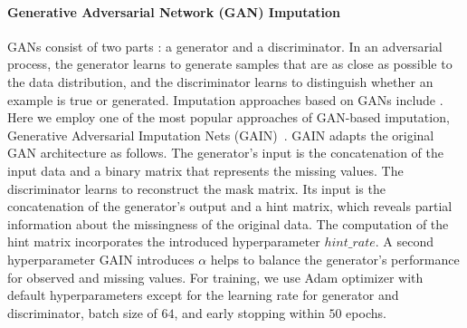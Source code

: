 \paragraph{Generative Adversarial Network (GAN) Imputation}
%
GANs consist of two parts \citep{GAN}: a generator and a discriminator. In an adversarial process, the generator learns to generate samples that are as close as possible to the data distribution, and the discriminator learns to distinguish whether an example is true or generated. Imputation approaches based on GANs include \cite{GAIN, VIGAN, MisGAN}.
Here we employ one of the most popular approaches of GAN-based imputation, Generative Adversarial Imputation Nets (GAIN)~\citep{GAIN}.
GAIN adapts the original GAN architecture as follows.
The generator's input is the concatenation of the input data and a binary matrix that represents the missing values. The discriminator learns to reconstruct the mask matrix. Its input is the concatenation of the generator's output and a hint matrix, which reveals partial information about the missingness of the original data. The computation of the hint matrix incorporates the introduced hyperparameter $hint\_rate$. A second hyperparameter GAIN introduces $\alpha$ helps to balance the generator's performance for observed and missing values.
For training, we use Adam optimizer with default hyperparameters except for the learning rate for generator and discriminator, batch size of $64$, and early stopping within $50$ epochs.


